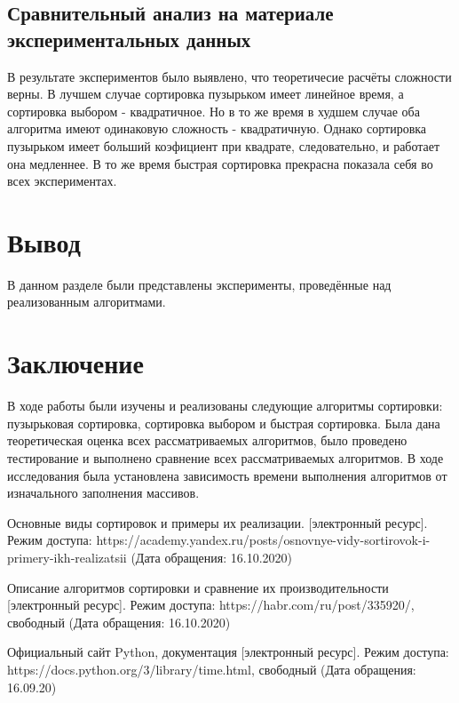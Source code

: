 \documentclass[12pt,a4paper]{article}
\numberwithin{equation}{section}
\begin{document}
\subsection{Сравнительный анализ на материале экспериментальных данных}
\qquad В результате экспериментов было выявлено, что теоретичесие расчёты сложности верны. В лучшем случае сортировка пузырьком имеет линейное время, а сортировка выбором - квадратичное. Но в то же время в худшем случае оба алгоритма имеют одинаковую сложность - квадратичную. Однако сортировка пузырьком имеет больший  коэфициент при квадрате, следовательно, и работает она медленнее. В то же время быстрая сортировка прекрасна показала себя во всех экспериментах.
\section*{Вывод}
\qquad В данном разделе были представлены эксперименты, проведённые над реализованным алгоритмами.
\clearpage
{}
\section*{\Huge Заключение}
\qquad В ходе работы были изучены  и реализованы следующие алгоритмы сортировки: пузырьковая сортировка, сортировка выбором и быстрая сортировка. Была дана теоретическая оценка всех рассматриваемых алгоритмов, было проведено тестирование и выполнено сравнение всех рассматриваемых алгоритмов. В ходе исследования была установлена зависимость времени выполнения алгоритмов от изначального заполнения массивов.

\clearpage
\renewcommand\refname{Список использованной литературы}
\begin{thebibliography}{}
	 Основные виды сортировок и примеры их реализации. [электронный ресурс]. Режим доступа: https://academy.yandex.ru/posts/osnovnye-vidy-sortirovok-i-primery-ikh-realizatsii
	(Дата обращения: 16.10.2020)
	
	 Описание алгоритмов сортировки и сравнение их производительности [электронный ресурс]. Режим доступа:
	https://habr.com/ru/post/335920/, свободный
	(Дата обращения: 16.10.2020)
	
	 Официальный сайт Python, документация [электронный ресурс]. Режим доступа: https://docs.python.org/3/library/time.html, свободный (Дата обращения: 16.09.20)
\end{thebibliography}
\end{document}
